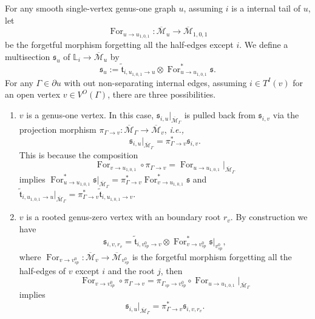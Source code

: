 \documentclass[11pt]{amsart}
\theoremstyle{definition}
\theoremstyle{remark}
\newcommand{\For}{\operatorname{For}}
\newcommand{\<}{\left<}
\renewcommand{\>}{\right>}
\numberwithin{equation}{section}
\def\Mbar{{\overline{\mathcal M}}}
\begin{document}
For any smooth single-vertex genus-one graph $u$, assuming $i$ is a internal tail of $u$, let 
$$
\For_{u\to u_{1,0,1}}\colon \Mbar_{u}\to \Mbar_{1,0,1}
$$
be the forgetful morphism forgetting all the half-edges except $i$. We define a multisection $\mathfrak{s}_{u}$ of $\mathbb L_i\to \Mbar_{u}$ by
$$
\mathfrak{s}_{u}:=\tilde{\mathfrak t}_{i,u_{1,0,1}\to u}\otimes \For_{u\to u_{1,0,1}}^*\mathfrak s.
$$
For any $\Gamma \in \partial u$ with out non-separating internal edges, assuming $i\in T^I(v)$ for an open vertex $v \in V^O(\Gamma)$, there are three possibilities.
\begin{enumerate}
    \item $v$ is a genus-one vertex. In this case, $\mathfrak s_{i,u}\vert_{\Mbar_{\Gamma}}$ is pulled back from $\mathfrak s_{i,v}$ via the projection morphism $\pi_{\Gamma\to v}\colon \Mbar_\Gamma \to \Mbar_v$, \textit{i.e.,}
    \begin{equation}\label{eq behaviour of trr genus one}
    \mathfrak s_{i,u}\vert_{\Mbar_{\Gamma}}=\pi^*_{\Gamma\to v} \mathfrak s_{i,v}.
    \end{equation}
    This is because the composition    \begin{equation*}
        \For_{v\to u_{1,0,1}}\circ\pi_{\Gamma\to v}=\For_{u\to u_{1,0,1}}\vert_{\Mbar_\Gamma}
    \end{equation*} 
    implies $\For_{u\to u_{1,0,1}}^*\mathfrak s\vert_{\Mbar_{\Gamma}}=\pi_{\Gamma\to v}^*\For_{v\to u_{1,0,1}}^*\mathfrak s$ and $\tilde{\mathfrak t}_{i,u_{1,0,1}\to u}\vert_{\Mbar_{\Gamma}}=\pi_{\Gamma\to v}^*\tilde{\mathfrak t}_{i,u_{1,0,1}\to v}$.
    \item $v$ is a rooted genus-zero vertex with an boundary root $r_v$. 
    By construction we have
    $$
     \mathfrak s_{i,v,r_v}=\tilde{\mathfrak t}_{i, v^0_{sp}\to v}\otimes \For^*_{v\to v_{sp}^0}\mathfrak s\vert_{v^0_{sp}},
    $$
    where $\For_{v\to v_{sp}^0}\colon \Mbar_v\to \Mbar_{v_{sp}^0}$ is the forgetful morphism forgetting all the half-edges of $v$ except $i$ and the root $j$, then 
    $$
    \For_{v\to v^0_{sp}}\circ\pi_{\Gamma\to v}=\pi_{\Gamma_{sp}\to v^0_{sp}}\circ\For_{u\to u_{1,0,1}}\vert_{\Mbar_\Gamma}
    $$
    implies 
    \begin{equation}\label{eq behaviour of trr 1 rooted}
    \mathfrak s_{i,u}\vert_{\Mbar_{\Gamma}}=\pi^*_{\Gamma \to v}\mathfrak s_{i,v,r_v}.
    \end{equation}
    

\end{enumerate}
\end{document}
